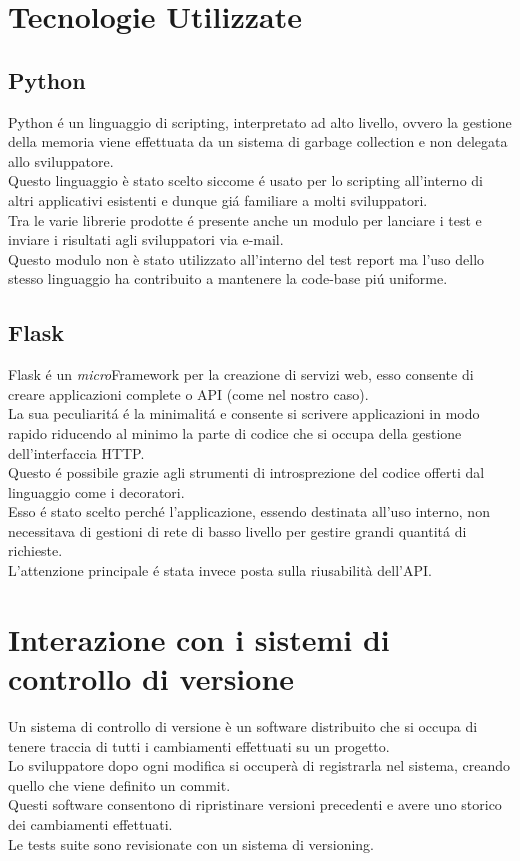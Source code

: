     \section{Tecnologie Utilizzate}  
        \subsection{Python}
            Python \'e un linguaggio di scripting, interpretato ad alto livello, ovvero la gestione della memoria viene effettuata da un sistema di garbage collection e non delegata allo sviluppatore.\\
            Questo linguaggio è stato scelto siccome \'e usato per lo scripting all'interno di altri applicativi esistenti e dunque gi\'a familiare a molti sviluppatori.\\
            Tra le varie librerie prodotte \'e presente anche un modulo per lanciare i test e inviare i risultati agli sviluppatori via e-mail.\\
            Questo modulo non è stato utilizzato all'interno del test report ma l'uso dello stesso linguaggio ha contribuito a mantenere la code-base pi\'u uniforme.
        \subsection{Flask}  
            Flask \'e un \textit{micro}Framework per la creazione di servizi web, esso consente di creare applicazioni complete o API (come nel nostro caso).\\
            La sua peculiarit\'a \'e la minimalit\'a e consente si scrivere applicazioni in modo rapido riducendo al minimo la parte di codice che si occupa della gestione dell'interfaccia HTTP.\\
            Questo \'e possibile grazie agli strumenti di introsprezione del codice offerti dal linguaggio come i decoratori.\\

            Esso \'e stato scelto perch\'e l'applicazione, essendo destinata all'uso interno, non necessitava di gestioni di rete di basso livello per gestire grandi quantit\'a di richieste.\\
            L'attenzione principale \'e stata invece posta sulla riusabilità dell'API.

    \section{Interazione con i sistemi di controllo di versione}           
        Un sistema di controllo di versione è un software distribuito che si occupa di tenere traccia di tutti i cambiamenti effettuati su un progetto.\\
        Lo sviluppatore dopo ogni modifica si occuperà di registrarla nel sistema, creando quello che viene definito un commit.\\
        Questi software consentono di ripristinare versioni precedenti e avere uno storico dei cambiamenti effettuati.\\
        Le tests suite sono revisionate con un sistema di versioning.
        
